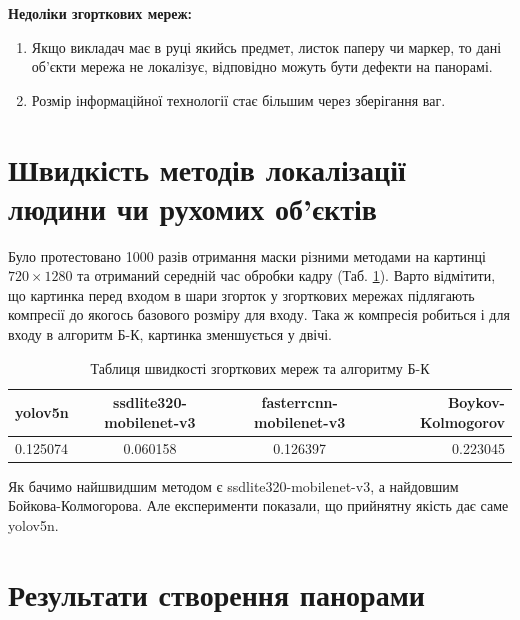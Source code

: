 \textbf{Недоліки згорткових мереж:}
\begin{enumerate}
    \item Якщо викладач має в руці якийсь предмет, листок паперу чи маркер, то дані
          об'єкти мережа не локалізує, відповідно можуть бути дефекти на панорамі.
    \item Розмір інформаційної технології стає більшим через зберігання ваг.
\end{enumerate}


\section{Швидкість методів локалізації людини чи рухомих об'єктів}

Було протестовано 1000 разів отримання маски різними методами на картинці $720 \times 1280$ та 
отриманий середній час обробки кадру (Таб. \ref{tab:speed_methods_table}).
Варто відмітити, що картинка перед входом в шари згорток у згорткових мережах підлягають 
компресії до якогось базового розміру для входу. Така ж компресія робиться і для входу 
в алгоритм Б-К, картинка зменшується у двічі.

\begin{table}[H]
    \begin{center}
        \caption{Таблиця швидкості згорткових мереж та алгоритму Б-К}
        \label{tab:speed_methods_table}
        \begin{tabular}{l|c|c|r}
            \textbf{yolov5n} & \textbf{ssdlite320-mobilenet-v3} & \textbf{fasterrcnn-mobilenet-v3} & \textbf{Boykov-Kolmogorov} \\
            \hline
            0.125074         & 0.060158                         & 0.126397                         & 0.223045                             \\
        \end{tabular}
    \end{center}
\end{table}


Як бачимо найшвидшим методом є ssdlite320-mobilenet-v3, а найдовшим Бойкова-Колмогорова.
Але експерименти показали, що прийнятну якість дає саме yolov5n.

\section{Результати створення панорами}


